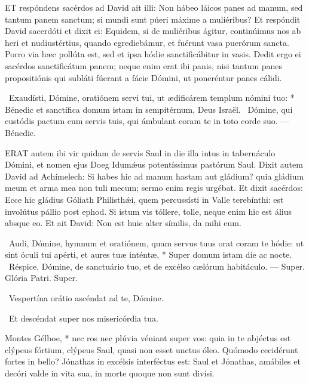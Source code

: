 
\lettrine[lines=2]{E}{T} respóndens sacérdos ad David ait illi: Non hábeo láicos panes ad manum, sed tantum panem sanctum; si mundi sunt púeri máxime a muliéribus? Et respóndit David sacerdóti et dixit ei: Equidem, si de muliéribus ágitur, continúimus nos ab heri et nudiustértius, quando egrediebámur, et fuérunt vasa puerórum sancta. Porro via hæc pollúta est, sed et ipsa hódie sanctificábitur in vasis. Dedit ergo ei sacérdos sanctificátum panem; neque enim erat ibi panis, nisi tantum panes propositiónis qui subláti fúerant a fácie Dómini, ut poneréntur panes cálidi.

\R\ Exaudísti, Dómine, oratiónem servi tui, ut ædificárem templum nómini tuo: * Bénedic et sanctífica domum istam in sempitérnum, Deus Israël. \V\ Dómine, qui custódis pactum cum servis tuis, qui ámbulant coram te in toto corde suo. --- Bénedic.



\lettrine[lines=2]{E}{RAT} autem ibi vir quidam de servis Saul in die illa intus in tabernáculo Dómini, et nomen ejus Doeg Idumǽus potentíssimus pastórum Saul. Dixit autem David ad Achímelech: Si habes hic ad manum hastam aut gládium? quia gládium meum et arma mea non tuli mecum; sermo enim regis urgébat. Et dixit sacérdos: Ecce hic gládius Góliath Philisthǽi, quem percussísti in Valle terebínthi: est involútus pállio post ephod. Si istum vis tóllere, tolle, neque enim hic est álius absque eo. Et ait David: Non est huic alter símilis, da mihi eum.

\R\ Audi, Dómine, hymnum et oratiónem, quam servus tuus orat coram te hódie: ut sint óculi tui apérti, et aures tuæ inténtæ, * Super domum istam die ac nocte. \V\ Réspice, Dómine, de sanctuário tuo, et de excélso cælórum habitáculo. --- Super. Glória Patri. Super.


\V\ Vespertína orátio ascéndat ad te, Dómine.

\R\ Et descéndat super nos misericórdia tua.

 Montes Gélboe, * nec ros nec plúvia véniant super vos: quia in te abjéctus est clýpeus fórtium, clýpeus Saul, quasi non esset unctus óleo. Quómodo cecidérunt fortes in bello? Jónathas in excélsis interféctus est: Saul et Jónathas, amábiles et decóri valde in vita sua, in morte quoque non sunt divísi.

